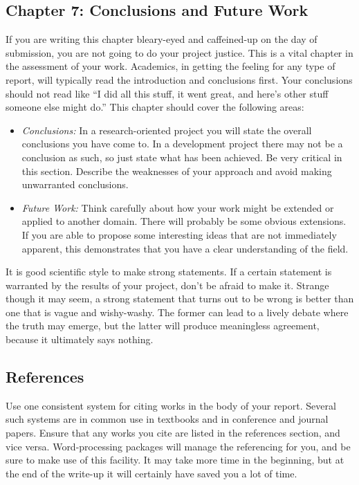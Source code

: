 \documentclass[]{final_report}
\begin{document}
\subsection{Chapter 7: Conclusions and Future Work}

If you are writing this chapter bleary-eyed and caffeined-up on the day of submission, you are not going to do your project justice. This is a vital chapter in the assessment of your work. Academics, in getting the feeling for any type of report, will typically read the introduction and conclusions first. Your conclusions should not read like ``I did all this stuff, it went great, and here's other stuff someone else might do.'' This chapter should cover the following areas:

\begin{itemize}
\item {\sl Conclusions:} In a research-oriented project you will state the overall conclusions you have come to. In a development project there may not be a conclusion as such, so just state what has been achieved. Be very critical in this section. Describe the weaknesses of your approach and avoid making unwarranted conclusions.
\item {\sl Future Work:} Think carefully about how your work might be extended or applied to another domain. There will probably be some obvious extensions. If you are able to propose some interesting ideas that are not immediately apparent, this demonstrates that you have a clear understanding of the field.
\end{itemize}

It is good scientific style to make strong statements. If a certain statement is warranted by the results of your project, don't be afraid to make it. Strange though it may seem, a strong statement that turns out to be wrong is better than one that is vague and wishy-washy. The former can lead to a lively debate where the truth may emerge, but the latter will produce meaningless agreement, because it ultimately says nothing.

\subsection{References}

Use one consistent system for citing works in the body of your report. Several such systems are in common use in textbooks and in conference and journal papers. Ensure that any works you cite are listed in the references section, and vice versa. Word-processing packages will manage the referencing for you, and be sure to make use of this facility. It may take more time in the beginning, but at the end of the write-up it will certainly have saved you a lot of time.
\end{document}
